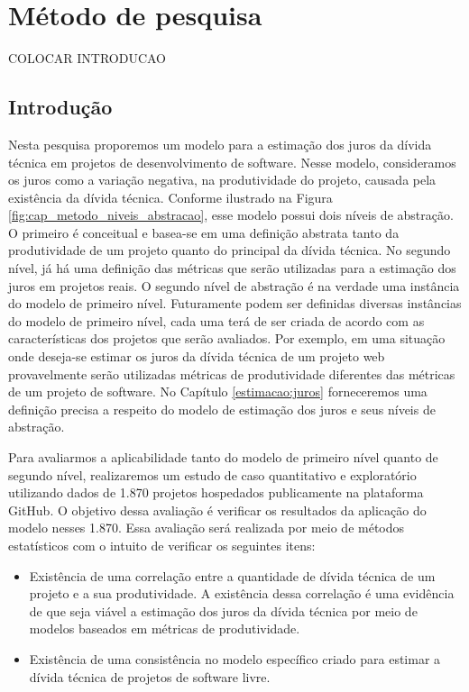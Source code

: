 \chapter{Método de pesquisa}
\label{cap:metodologia}

COLOCAR INTRODUCAO

\section{Introdução}

Nesta pesquisa proporemos um modelo para a estimação dos juros da dívida técnica em projetos de desenvolvimento de software. Nesse modelo, consideramos os juros como a variação negativa, na produtividade do projeto, causada pela existência da dívida técnica. Conforme ilustrado na Figura \ref{fig:cap_metodo_niveis_abstracao}, esse modelo possui dois níveis de abstração. O primeiro é conceitual e basea-se em uma definição abstrata tanto da produtividade de um projeto quanto do principal da dívida técnica. No segundo nível, já há uma definição das métricas que serão utilizadas para a estimação dos juros em projetos reais. O segundo nível de abstração é na verdade uma instância do modelo de primeiro nível. Futuramente podem ser definidas diversas instâncias do modelo de primeiro nível, cada uma terá de ser criada de acordo com as características dos projetos que serão avaliados. Por exemplo, em uma situação onde deseja-se estimar os juros da dívida técnica de um projeto web provavelmente serão utilizadas métricas de produtividade diferentes das métricas de um projeto de software. No Capítulo \ref{estimacao:juros} forneceremos  uma definição precisa a respeito do modelo de estimação dos juros e seus níveis de abstração. 

Para avaliarmos a aplicabilidade tanto do modelo de primeiro nível quanto de segundo nível, realizaremos um estudo de caso quantitativo e exploratório utilizando dados de 1.870 projetos hospedados publicamente na plataforma GitHub. O objetivo dessa avaliação é verificar os resultados da aplicação do modelo nesses 1.870. Essa avaliação será realizada por meio de métodos estatísticos com o intuito de verificar os seguintes itens:

\begin{itemize}
\item Existência de uma correlação entre a quantidade de dívida técnica de um projeto e a sua produtividade.  A existência dessa correlação é uma evidência de que seja viável a estimação dos juros da dívida técnica por meio de modelos baseados em métricas de produtividade. 
\item Existência de uma consistência no modelo específico criado para estimar a dívida técnica de projetos de software livre.
\end{itemize} 



